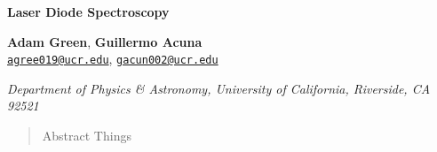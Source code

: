 \documentclass[12pt]{article}
\newcommand{\email}[1]{\href{mailto:#1}{#1}}
\newenvironment{institutions}[1][2em]{\begin{list}{}{\setlength\leftmargin{#1}\setlength\rightmargin{#1}}\item[]}{\end{list}}
\begin{document}
	
	
	
	\begin{center}
		
		{\huge \bf Laser Diode Spectroscopy}
		
		\vspace{0.5cm}
		
		\textbf{Adam Green}, \textbf{Guillermo Acuna}\\
		
		\texttt{\footnotesize \email{agree019@ucr.edu}},
		\texttt{\footnotesize \email{gacun002@ucr.edu}}
		
		\vspace{0.5cm}
		
		
		\begin{institutions}[2.25cm]
			\footnotesize
			{\it 
				Department of Physics \& Astronomy, 
				University of  California, Riverside, 
				{CA} 92521	    
			}    
		\end{institutions}
		
		\vspace{0.5cm}
		
	\end{center}
	
	\vspace{0.5cm}
	\begin{abstract}
		Abstract Things
	\end{abstract}
	
	
	
\end{document}
